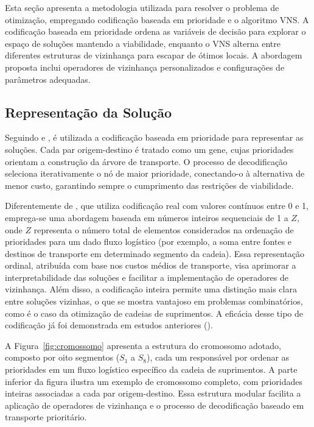 \documentclass[conference]{IEEEtran}
\begin{document}
Esta seção apresenta a metodologia utilizada para resolver o problema de otimização, empregando codificação baseada em prioridade \cite{b12} e o algoritmo VNS. A codificação 
baseada em prioridade ordena as variáveis de decisão para explorar o espaço de soluções mantendo a viabilidade, enquanto o VNS alterna entre diferentes estruturas de vizinhança para escapar de ótimos locais. 
A abordagem proposta inclui operadores de vizinhança personalizados e configurações de parâmetros adequadas.

\subsection{Representação da Solução}
Seguindo \cite{b2} e \cite{b12}, é utilizada a codificação baseada em prioridade para representar as soluções. Cada par origem-destino é tratado como um gene, cujas prioridades 
orientam a construção da árvore de transporte. O processo de decodificação seleciona iterativamente o nó de maior prioridade, conectando-o à alternativa de menor custo, garantindo sempre o cumprimento das 
restrições de viabilidade.

Diferentemente de \cite{b2}, que utiliza codificação real com valores contínuos entre 0 e 1, emprega-se uma abordagem baseada em números inteiros sequenciais de 1 a $Z$, onde $Z$ representa o número total 
de elementos considerados na ordenação de prioridades para um dado fluxo logístico (por exemplo, a soma entre fontes e destinos de transporte em determinado segmento da cadeia). Essa representação ordinal, 
atribuída com base nos custos médios de transporte, visa aprimorar a interpretabilidade das soluções e facilitar a implementação de operadores de vizinhança. Além disso, a codificação inteira permite uma 
distinção mais clara entre soluções vizinhas, o que se mostra vantajoso em problemas combinatórios, como é o caso da otimização de cadeias de suprimentos. A eficácia desse tipo de codificação já foi 
demonstrada em estudos anteriores (\hspace{-0.03em}\cite{b11,b12,b13}).

A Figura~\ref{fig:cromossomo} apresenta a estrutura do cromossomo adotado, composto por oito segmentos ($S_1$ a $S_8$), cada um responsável por ordenar as prioridades 
em um fluxo logístico específico da cadeia de suprimentos. A parte inferior da figura ilustra um exemplo de cromossomo completo, com prioridades inteiras associadas a 
cada par origem-destino. Essa estrutura modular facilita a aplicação de operadores de vizinhança e o processo de decodificação baseado em transporte prioritário.
\end{document}
